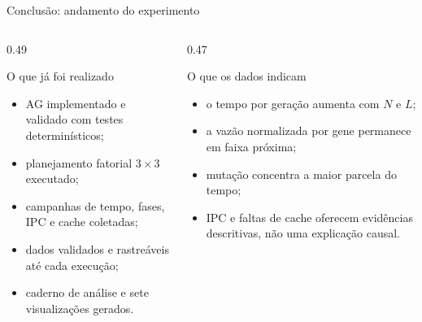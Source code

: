 \documentclass[aspectratio=169,11pt]{beamer}
\begin{document}
\begin{frame}{Conclusão: andamento do experimento}
    \begin{columns}[T,onlytextwidth]
        \begin{column}{0.49\textwidth}
            \begin{questionbox}{O que já foi realizado}
                \begin{itemize}
                    \item AG implementado e validado com testes determinísticos;
                    \item planejamento fatorial $3 \times 3$ executado;
                    \item campanhas de tempo, fases, IPC e cache coletadas;
                    \item dados validados e rastreáveis até cada execução;
                    \item caderno de análise e sete visualizações gerados.
                \end{itemize}
            \end{questionbox}
        \end{column}
        \begin{column}{0.47\textwidth}
            \begin{questionbox}{O que os dados indicam}
                \begin{itemize}
                    \item o tempo por geração aumenta com $N$ e $L$;
                    \item a vazão normalizada por gene permanece em faixa próxima;
                    \item mutação concentra a maior parcela do tempo;
                    \item IPC e faltas de cache oferecem evidências descritivas,
                    não uma explicação causal.
                \end{itemize}
            \end{questionbox}
        \end{column}
    \end{columns}
    \vspace{0.22cm}
\end{frame}
\end{document}
